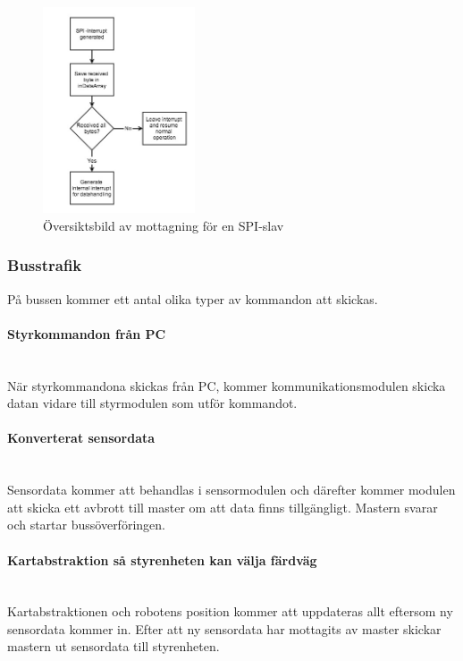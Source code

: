 \documentclass[a4paper,12pt,fleqn]{article}
\begin{document}
\begin{figure}[htp] %
  \begin{center}
  \includegraphics[keepaspectratio=true,width=0.4\textwidth]{bilder/spislaverec.jpg}  %
  \end{center}
  \caption{Översiktsbild av mottagning för en SPI-slav} %
  \label{fig:spislave}
\end{figure}





\subsubsection{Busstrafik}
På bussen kommer ett antal olika typer av kommandon att skickas. 

\paragraph{Styrkommandon från PC}
~\\
När styrkommandona skickas från PC, kommer kommunikationsmodulen skicka datan vidare till styrmodulen som utför kommandot.
\paragraph{Konverterat sensordata}
~\\
Sensordata kommer att behandlas i sensormodulen och därefter kommer modulen att skicka ett avbrott till master om att data finns tillgängligt. Mastern svarar och startar bussöverföringen.
\paragraph{Kartabstraktion så styrenheten kan välja färdväg}
~\\
Kartabstraktionen och robotens position kommer att uppdateras allt eftersom ny sensordata kommer in. Efter att ny sensordata har mottagits av master skickar mastern ut sensordata till styrenheten.
\end{document}
